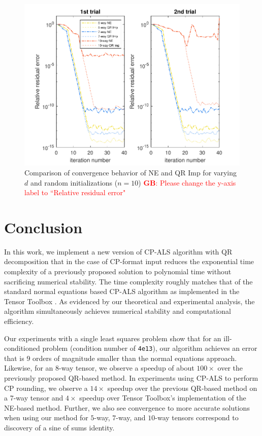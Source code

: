 \documentclass{article}
\newcommand{\GB}[1]{\textcolor{red}{\textbf{GB}: #1}}
\begin{document}
\begin{figure}[ht!]
  \begin{center}  
    \includegraphics*[scale = 1.1]{sinsums_acc2.pdf}
    \caption[Figure]{Comparison of convergence behavior of NE and QR Imp for varying $d$ and random initializations ($n=10$) \GB{Please change the y-axis label to ``Relative residual error"} \label{fig:error}}
  \end{center}  
\end{figure}

\section{Conclusion}
\label{sec:conclusion}

In this work, we implement a new version of CP-ALS algorithm with QR decomposition that in the case of CP-format input reduces the exponential time complexity of a previously proposed solution \cite{MVLB23} to polynomial time without sacrificing numerical stability.
The time complexity roughly matches that of the standard normal equations based CP-ALS algorithm as implemented in the Tensor Toolbox \cite{TensorToolbox}.
As evidenced by our theoretical and experimental analysis, the algorithm simultaneously achieves numerical stability and computational efficiency.

Our experiments with a single least squares problem show that for an ill-conditioned problem (condition number of \texttt{4e13}), our algorithm achieves an error that is 9 orders of magnitude smaller than the normal equations approach.
Likewise, for an 8-way tensor, we observe a speedup of about $100\times$ over the previously proposed QR-based method.
In experiments using CP-ALS to perform CP rounding, we observe a $14\times$ speedup over the previous QR-based method on a 7-way tensor and $4\times$ speedup over Tensor Toolbox's implementation of the NE-based method.
Further, we also see convergence to more accurate solutions when using our method for $5$-way, $7$-way, and $10$-way tensors correspond to discovery of a sine of sums identity.
\end{document}
